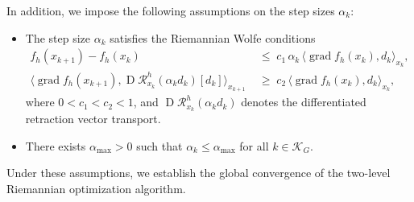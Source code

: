 \documentclass[11pt,reqno]{amsart}
\theoremstyle{plain}
\DeclareMathOperator{\Drm}{D}
\DeclareMathOperator{\grad}{grad}
\newcommand\calK{\mathcal K}
\newcommand{\Ret}{\mathcal R}
\begin{document}
	In addition, we impose the following assumptions on the step sizes $\alpha_k$:
	\begin{itemize}[itemsep=0.2em]
		\item[\bf{A4:}]
		The step size $\alpha_k$ satisfies the Riemannian Wolfe conditions
		\begin{subequations}\label{eq:Wolfe}
			\begin{align}
				f_h(x_{k+1}) - f_h(x_k) &\;\leq\; c_1\,\alpha_k\,\big\langle \grad f_h(x_k), d_k\big\rangle_{x_k},
				\label{eq:Wolfe1}\\
				\big\langle \grad f_h(x_{k+1}), \Drm\Ret_{x_k}^h(\alpha_k d_k)[d_k]\big\rangle_{x_{k+1}}
				&\;\geq\; c_2\,\big\langle \grad f_h(x_k), d_k\big\rangle_{x_k},
				\label{eq:Wolfe2}
			\end{align}
		\end{subequations}
		where $0 < c_1 < c_2 < 1$,  and $\Drm\Ret_{x_k}^h(\alpha_k d_k)$ denotes the differentiated retraction vector transport.
		
		\item[\bf{A5:}] There exists $\alpha_{\max}>0$ such that $\alpha_k \le \alpha_{\max}$ for all $k\in\calK_G$.
	\end{itemize}
	Under these assumptions, we establish the global convergence of the two-level Riemannian optimization algorithm. 
	
\end{document}

